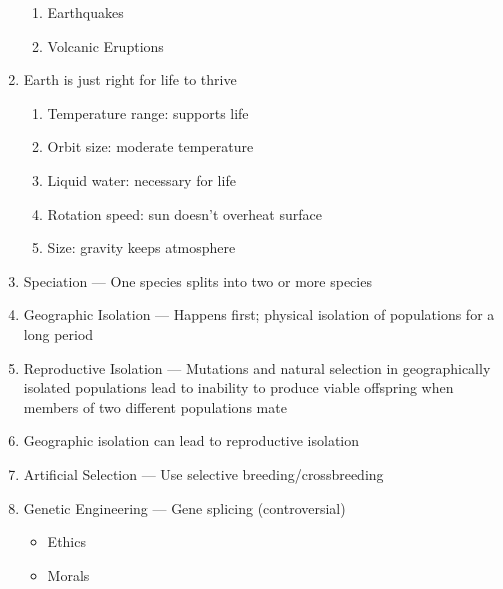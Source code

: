 \documentclass[12pt]{article}
\begin{document}
\begin{enumerate}
\begin{enumerate}
      \item Earthquakes

      \item Volcanic Eruptions

    \end{enumerate}

  \item Earth is just right for life to thrive

    \begin{enumerate}

      \item Temperature range: supports life

      \item Orbit size: moderate temperature

      \item Liquid water: necessary for life

      \item Rotation speed: sun doesn't overheat surface

      \item Size: gravity keeps atmosphere

    \end{enumerate}

  \item Speciation — One species splits into two or more species

  \item Geographic Isolation — Happens first; physical isolation of populations for a long period

  \item Reproductive Isolation — Mutations and natural selection in geographically isolated populations lead to inability to produce viable offspring when members of two different populations mate

  \item Geographic isolation can lead to reproductive isolation

  \item Artificial Selection — Use selective breeding/crossbreeding

  \item Genetic Engineering — Gene splicing (controversial)

    \begin{itemize}

      \item Ethics

      \item Morals


\end{itemize}
\end{enumerate}
\end{document}
